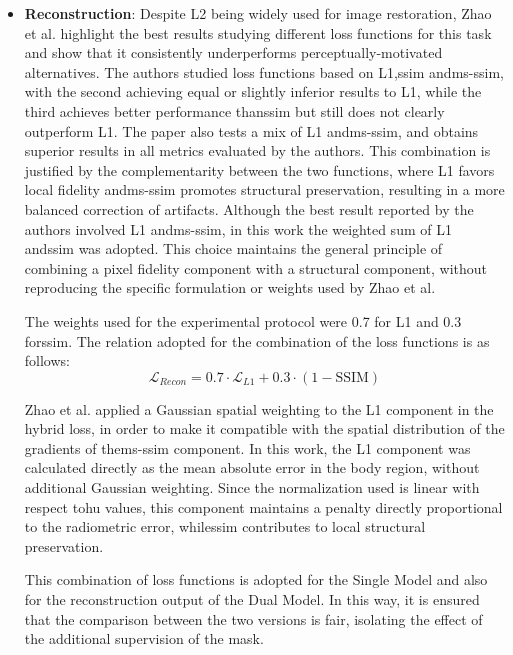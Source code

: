 \begin{itemize}
    \item \textbf{Reconstruction}: Despite L2 being widely used for image restoration, Zhao et al. \cite{zhaoLossFunctionsImage2017} highlight the best results studying different loss functions for this task and show that it consistently underperforms perceptually-motivated alternatives. The authors studied loss functions based on L1,\acrshort{ssim} and\acrshort{ms-ssim}, with the second achieving equal or slightly inferior results to L1, while the third achieves better performance than\acrshort{ssim} but still does not clearly outperform L1. The paper also tests a mix of L1 and\acrshort{ms-ssim}, and obtains superior results in all metrics evaluated by the authors. This combination is justified by the complementarity between the two functions, where L1 favors local fidelity and\acrshort{ms-ssim} promotes structural preservation, resulting in a more balanced correction of artifacts. Although the best result reported by the authors involved L1 and\acrshort{ms-ssim}, in this work the weighted sum of L1 and\acrshort{ssim} was adopted. This choice maintains the general principle of combining a pixel fidelity component with a structural component, without reproducing the specific formulation or weights used by Zhao et al.
    
    The weights used for the experimental protocol were 0.7 for L1 and 0.3 for\acrshort{ssim}.
    The relation adopted for the combination of the loss functions is as follows:
        \[
        \mathcal{L}_{Recon} = 0{.}7 \cdot \mathcal{L}_{L1} + 0{.}3 \cdot (1 - \text{SSIM})
        \]

    Zhao et al. \cite{zhaoLossFunctionsImage2017} applied a Gaussian spatial weighting to the L1 component in the hybrid loss, in order to make it compatible with the spatial distribution of the gradients of the\acrshort{ms-ssim} component. In this work, the L1 component was calculated directly as the mean absolute error in the body region, without additional Gaussian weighting. Since the normalization used is linear with respect to\acrshort{hu} values, this component maintains a penalty directly proportional to the radiometric error, while\acrshort{ssim} contributes to local structural preservation.

    This combination of loss functions is adopted for the Single Model and also for the reconstruction output of the Dual Model. In this way, it is ensured that the comparison between the two versions is fair, isolating the effect of the additional supervision of the mask.


\end{itemize}
